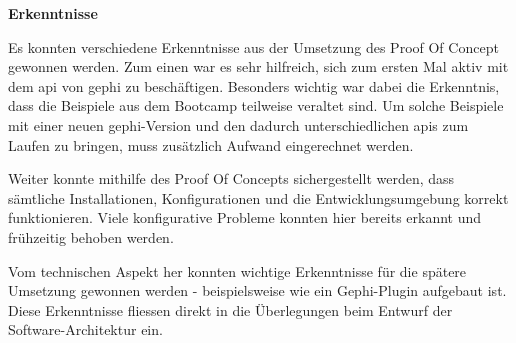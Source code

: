 \textbf{Erkenntnisse}

Es konnten verschiedene Erkenntnisse aus der Umsetzung des Proof Of Concept gewonnen werden.
Zum einen war es sehr hilfreich, sich zum ersten Mal aktiv mit dem \acs{api} von \acs{gephi} zu beschäftigen. Besonders wichtig war
dabei die Erkenntnis, dass die Beispiele aus dem Bootcamp teilweise veraltet sind. Um solche Beispiele mit einer neuen \acs{gephi}-Version
und den dadurch unterschiedlichen \acs{api}s zum Laufen zu bringen, muss zusätzlich Aufwand eingerechnet werden.

Weiter konnte mithilfe des Proof Of Concepts sichergestellt werden, dass sämtliche Installationen, Konfigurationen und die
Entwicklungsumgebung korrekt funktionieren. Viele konfigurative Probleme konnten hier bereits erkannt und frühzeitig behoben werden.

Vom technischen Aspekt her konnten wichtige Erkenntnisse für die spätere Umsetzung gewonnen werden - beispielsweise
wie ein Gephi-Plugin aufgebaut ist. Diese Erkenntnisse fliessen direkt in die Überlegungen beim Entwurf der Software-Architektur ein.


